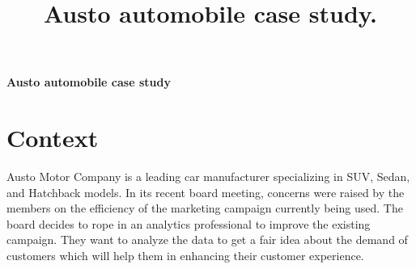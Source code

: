 \documentclass[12pt,a4paper]{style}
\title{\Large \bf
	Austo automobile case study. %
}
\begin{document}
\tableofcontents
\listoffigures
\newpage
\begin{center}
\Large {\bf{Austo automobile case study}}    
\end{center}

	\section{Context}
	Austo Motor Company is a leading car manufacturer specializing in SUV, Sedan, and Hatchback models. In its recent board meeting, concerns were raised by the members on the efficiency of the marketing campaign currently being used. The board decides to rope in an analytics professional to improve the existing campaign. They want to analyze the data to get a fair idea about the demand of customers which will help them in enhancing their customer experience.
	
\end{document}
